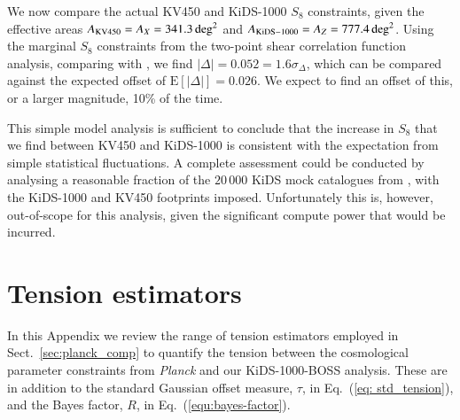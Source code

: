 \begin{appendix}
We now compare the actual KV450 and KiDS-1000 $S_8$ constraints, given the effective areas $A_{\rm KV450} = A_X = 341.3\,\mathrm{deg}^{2}$ and $A_{\rm KiDS-1000} = A_Z = 777.4\,\mathrm{deg}^{2}$. 
Using the marginal $S_8$ constraints from the two-point shear correlation function analysis, comparing \citet[][KV450: $S_8 = 0.716^{+0.043}_{-0.038}$]{wright/etal:2020b} with \citet[][KiDS-1000: $S_8=0.768^{+0.016}_{-0.020}$]{asgari/etal:inprep}, 
we find $|\Delta|= 0.052 = 1.6\sigma_\Delta$, which can be compared against the expected offset of $\mathrm{E}[|\Delta|]=0.026$. 
We expect to find an offset of this, or a larger magnitude, 10\% of the time.  

This simple model analysis is sufficient to conclude that the increase in $S_8$ that we find between KV450 and KiDS-1000 is consistent with the expectation from simple statistical fluctuations.    A complete assessment could be conducted by analysing a reasonable fraction of the $20\,000$ KiDS mock catalogues from \citet{joachimi/etal:inprep}, with the KiDS-1000 and KV450 footprints imposed.  Unfortunately this is, however, out-of-scope for this analysis, given the significant compute power that would be incurred.


\section{Tension estimators}
\label{app:tensionest}
In this Appendix we review the range of tension estimators employed in Sect.~\ref{sec:planck_comp} to quantify the tension between the cosmological parameter constraints from {\it Planck} and our KiDS-1000-BOSS \tttp analysis.   These are in addition to the standard Gaussian offset measure, $\tau$, in Eq.~(\ref{eq: std_tension}), and the Bayes factor, $R$, in Eq.~(\ref{equ:bayes-factor}).


\end{appendix}
